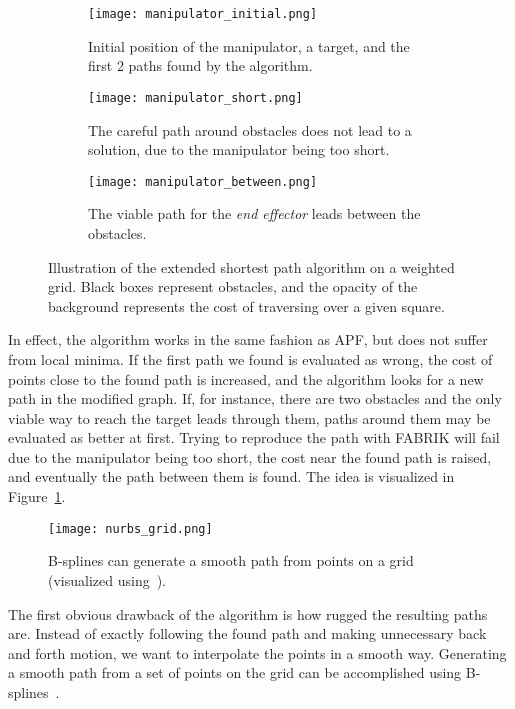 \begin{figure}
    \centering
    \begin{subfigure}[t]{.3\textwidth}
      \texttt{[image: manipulator\_initial.png]}
      \caption{Initial position of the manipulator, a target, and the first 2 paths found by the algorithm.}
    \end{subfigure}
    \begin{subfigure}[t]{0.3\textwidth}
      \texttt{[image: manipulator\_short.png]}
      \caption{The careful path around obstacles does not lead to a solution, due to the manipulator being too short.}
    \end{subfigure}
    \begin{subfigure}[t]{.3\textwidth}
      \texttt{[image: manipulator\_between.png]}
      \caption{The viable path for the \textit{end effector} leads between the obstacles.}
    \end{subfigure}
    \caption{Illustration of the extended shortest path algorithm on a weighted grid. Black boxes represent obstacles, and the opacity of the background represents the cost of traversing over a given square.}\label{fig:paths}
\end{figure}

In effect, the algorithm works in the same fashion as APF, but does not suffer from local minima. If the first path we found is evaluated as wrong, the cost of points close to the found path is increased, and the algorithm looks for a new path in the modified graph. If, for instance, there are two obstacles and the only viable way to reach the target leads through them, paths around them may be evaluated as better at first. Trying to reproduce the path with FABRIK will fail due to the manipulator being too short, the cost near the found path is raised, and eventually the path between them is found. The idea is visualized in Figure~\ref{fig:paths}.

\begin{wrapfigure}{r}{0.42\textwidth}
  \centering
  \texttt{[image: nurbs\_grid.png]}
  \caption{B-splines can generate a smooth path from points on a grid (visualized using~\cite{nurbs_vis}).}
\end{wrapfigure}

The first obvious drawback of the algorithm is how rugged the resulting paths are. Instead of exactly following the found path and making unnecessary back and forth motion, we want to interpolate the points in a smooth way. Generating a smooth path from a set of points on the grid can be accomplished using B-splines~\cite{nurbs}.

